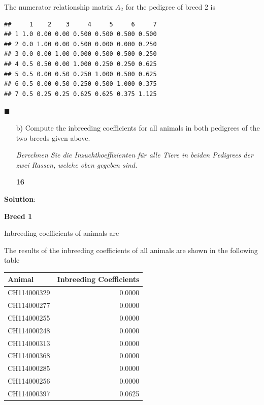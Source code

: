 \documentclass[
]{article}
\newenvironment{Shaded}{\begin{snugshade}}{\end{snugshade}}
\newcommand{\AttributeTok}[1]{\textcolor[rgb]{0.77,0.63,0.00}{#1}}
\newcommand{\DecValTok}[1]{\textcolor[rgb]{0.00,0.00,0.81}{#1}}
\newcommand{\FunctionTok}[1]{\textcolor[rgb]{0.00,0.00,0.00}{#1}}
\newcommand{\NormalTok}[1]{#1}
\newcommand{\OtherTok}[1]{\textcolor[rgb]{0.56,0.35,0.01}{#1}}
\newcommand{\SpecialCharTok}[1]{\textcolor[rgb]{0.00,0.00,0.00}{#1}}
\newcommand{\StringTok}[1]{\textcolor[rgb]{0.31,0.60,0.02}{#1}}
\newcommand{\points}[1]
{\begin{flushright}\textbf{#1}\end{flushright}}
\newcommand{\solstart}
{\vspace{3ex}\textbf{Solution}:}
\newcommand{\solend}
{\vspace{2ex}$\blacksquare$}
\begin{document}
The numerator relationship matrix \(A_2\) for the pedigree of breed 2 is

\begin{verbatim}
##     1    2    3     4     5     6     7
## 1 1.0 0.00 0.00 0.500 0.500 0.500 0.500
## 2 0.0 1.00 0.00 0.500 0.000 0.000 0.250
## 3 0.0 0.00 1.00 0.000 0.500 0.500 0.250
## 4 0.5 0.50 0.00 1.000 0.250 0.250 0.625
## 5 0.5 0.00 0.50 0.250 1.000 0.500 0.625
## 6 0.5 0.00 0.50 0.250 0.500 1.000 0.375
## 7 0.5 0.25 0.25 0.625 0.625 0.375 1.125
\end{verbatim}

\solend

\clearpage
\pagebreak

\begin{enumerate}
\item[b)] Compute the inbreeding coefficients for all animals in both pedigrees of the two breeds given above. 

\textit{Berechnen Sie die Inzuchtkoeffizienten für alle Tiere in beiden Pedigrees der zwei Rassen, welche oben gegeben sind.}
\points{16}
\end{enumerate}

\vspace{3ex}
\solstart

\textbf{Breed 1}

Inbreeding coefficients of animals are

\begin{Shaded}
\end{Shaded}

The results of the inbreeding coefficients of all animals are shown in
the following table

\begin{longtable}[]{@{}lr@{}}
\toprule()
Animal & Inbreeding Coefficients \\
\midrule()
\endhead
CH114000329 & 0.0000 \\
CH114000277 & 0.0000 \\
CH114000255 & 0.0000 \\
CH114000248 & 0.0000 \\
CH114000313 & 0.0000 \\
CH114000368 & 0.0000 \\
CH114000285 & 0.0000 \\
CH114000256 & 0.0000 \\
CH114000397 & 0.0625 \\
\bottomrule()
\end{longtable}
\end{document}
